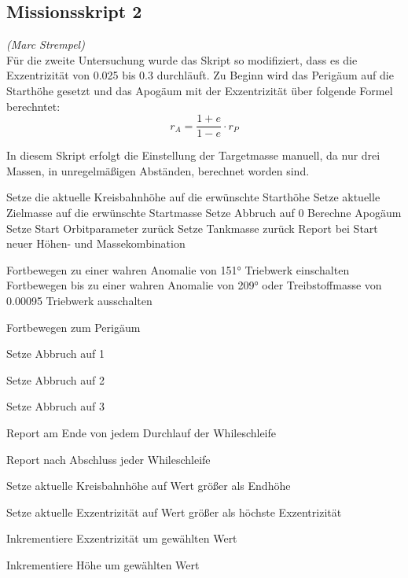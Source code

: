 
\subsection{Missionsskript 2}
\hfill\emph{(Marc Strempel)}\\
Für die zweite Untersuchung wurde das Skript so modifiziert, dass es die Exzentrizität von \num{0.025} bis \num{0.3} durchläuft.
Zu Beginn wird das Perigäum auf die Starthöhe gesetzt und das Apogäum mit der Exzentrizität über folgende Formel berechntet:\\
\begin{equation}
r_A = \frac{1+e}{1-e}\cdot r_P
\label{apoapsis}
\end{equation}

In diesem Skript erfolgt die Einstellung der Targetmasse manuell, da nur drei Massen, in unregelmäßigen Abständen, berechnet worden sind.\\

\begin{algorithmic}

\STATE Setze die aktuelle Kreisbahnhöhe auf die erwünschte Starthöhe
\STATE Setze aktuelle Zielmasse auf die erwünschte Startmasse
\STATE Setze Abbruch auf 0
\STATE Berechne Apogäum
\STATE Setze Start Orbitparameter zurück
\STATE Setze Tankmasse zurück
\RETURN Report bei Start neuer Höhen- und Massekombination


\STATE Fortbewegen zu einer wahren Anomalie von 151°
\STATE Triebwerk einschalten
\STATE Fortbewegen bis zu einer wahren Anomalie von 209° oder Treibstoffmasse von 0.00095 
\STATE Triebwerk ausschalten
\ENDIF

\STATE Fortbewegen zum Perigäum
\ENDIF

\STATE Setze Abbruch auf 1
\ENDIF

\STATE Setze Abbruch auf 2
\ENDIF

\STATE Setze Abbruch auf 3
\ENDIF

\RETURN Report am Ende von jedem Durchlauf der Whileschleife
\ENDWHILE

\RETURN Report nach Abschluss jeder Whileschleife


\STATE Setze aktuelle Kreisbahnhöhe auf Wert größer als Endhöhe 
\ENDIF

\STATE Setze aktuelle Exzentrizität auf Wert größer als höchste Exzentrizität
\ENDIF

\STATE Inkrementiere Exzentrizität um gewählten Wert
\ENDWHILE

\STATE Inkrementiere Höhe um gewählten Wert
\ENDWHILE

\end{algorithmic}


